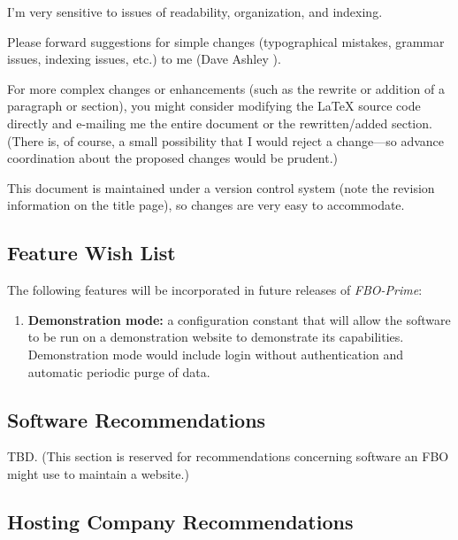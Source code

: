 \documentclass[letterpaper,10pt,titlepage]{article}
\newcommand{\productbasename}{FBO-Prime}
\begin{document}
I'm very sensitive to issues of readability, organization,
and indexing.

Please forward suggestions for simple changes
(typographical mistakes, grammar issues, indexing issues, etc.)
to me (Dave Ashley \cite{bibref:i:ashleydavidt}).

For more complex changes or enhancements
(such as the rewrite or addition of a paragraph or section), 
you might consider
modifying the \LaTeX{} source code directly and e-mailing me the entire document
or the rewritten/added section.  (There is, of course, a small possibility that I
would reject a change---so advance coordination about the proposed
changes would be prudent.)

This document is maintained under a version control system (note the revision 
information on the title page), so changes are very easy to accommodate.



\subsection{Feature Wish List}
\label{siov0:sfwl0}

The following features will be incorporated
in future releases of \emph{\productbasename{}}:

\begin{enumerate}
\item \textbf{Demonstration mode:}
      a configuration constant that will allow the software to be 
      run on a demonstration website to demonstrate its capabilities.
      Demonstration mode would include login without authentication
      and automatic periodic purge of data.
\end{enumerate}


\subsection{Software Recommendations}
\label{siov0:ssrc0}

TBD\@.  (This section is reserved for recommendations concerning software
an FBO might use to maintain a website.)


\subsection{Hosting Company Recommendations}
\label{siov0:shrc0}
\end{document}
